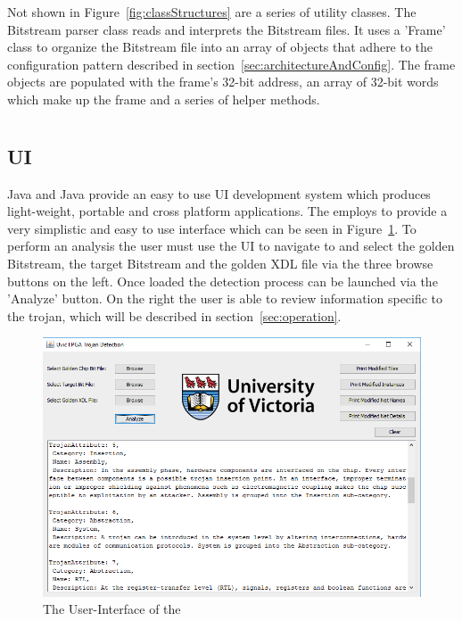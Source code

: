 Not shown in Figure~\ref{fig:classStructures} are a series of utility classes.
The \gls{Bitstream} parser class reads and interprets the \gls{Bitstream} files. 
It uses a 'Frame' class to organize the \gls{Bitstream} file into an array of objects that adhere to the configuration pattern described in section~\ref{sec:architectureAndConfig}.
The frame objects are populated with the frame's 32-bit address, an array of 32-bit words which make up the frame and a series of helper methods.
\section{\Name}
\subsection{\acrfull{UI}}
Java and Java \Swing provide an easy to use \acrlong{UI} development system which produces light-weight, portable and cross platform applications.
The \NameNoPeriod employs \Swing to provide a very simplistic and easy to use interface which can be seen in Figure~\ref{fig:UI}.
To perform an analysis the user must use the \acrshort{UI} to navigate to and select the \gls{golden} \gls{Bitstream}, the \gls{target} \gls{Bitstream} and the \gls{golden} \acrshort{XDL} file via the three browse buttons on the left.
Once loaded the detection process can be launched via the 'Analyze' button.
On the right the user is able to review information specific to the trojan, which will be described in section~\ref{sec:operation}.
\begin{figure}
\centering
\includegraphics[width=0.96\linewidth]{Figures/UI}
\caption[The User-Interface of the \NameNoPeriod]{The User-Interface of the \NameNoPeriod}
\label{fig:UI}
\end{figure}
 

